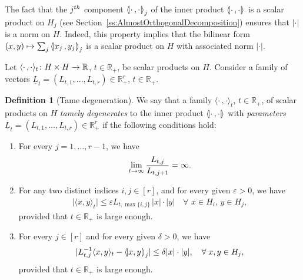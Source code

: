 \documentclass[10pt,a4paper]{amsart}
\newcommand{\innone}[2]{{\langle#2\rangle_{#1}}}
\newcommand{\llangle}{\mathopen{\langle\mkern -3.1mu\lvert}}
\newcommand{\rrangle}{\mathclose{\rvert\mkern -3.1mu\rangle}}
\newcommand{\highinn}[2]{{\llangle#2\rrangle_{#1}}}
\newcommand{\refnorm}[1]{\lvert#1\rvert}
\newcommand{\abs}[1]{\lvert #1\rvert}
\newcommand{\R}{\mathbb{R}}
\renewcommand*{\to}{\mathchoice{\longrightarrow}{\rightarrow}{\rightarrow}{\rightarrow}}
\let\oldmapsto\mapsto
\renewcommand*{\mapsto}{\mathchoice{\longmapsto}{\oldmapsto}{\oldmapsto}{\oldmapsto}}
\newcommand*{\relabel}{\renewcommand{\labelenumi}{(\theenumi)}}
\newcommand*{\alphenumi}{\renewcommand*{\theenumi}{\alph{enumi}}\relabel}
\let\oldforall\forall
\renewcommand*{\forall}{\mathrel{\oldforall}}
\theoremstyle{definition}\newtheorem{defi}[cdrthm]{Definition}
\begin{document}
The fact that the $j^{\rm th}$ component $\highinn{j}{\cdot \,, \cdot}$ of the inner product $\highinn{}{\cdot \,, \cdot}$ is a scalar product on $H_j$ (see Section~\ref{ss:AlmostOrthogonalDecomposition}) ensures that $\refnorm{\cdot}$ is a norm on $H$. Indeed, this property implies that the bilinear form $(x,y) \mapsto \sum_{j} \highinn{j}{x_j\,,y_j}$ is a scalar product on $H$ with associated norm $\refnorm{\cdot}$.

\setcounter{cdrthm}{2}
Let $\innone{t}{\cdot\,, \cdot} \colon H \times H \to \R$, $t\in \R_+$, be scalar products on $H$. Consider a family of vectors $\underline L_t = (L_{t,1}, \dots, L_{t,r}) \in \R_+^r$, $t\in \R_+$.

\begin{defi}[Tame degeneration] \label{def:TameDegenerations}
We say that a family $\innone{t}{\cdot\,, \cdot}$, $t\in \R_+$, of scalar products on $H$ \emph{tamely degenerates} to the inner product $\highinn{}{\cdot\,, \cdot}$ with \emph{parameters} $\underline L_t = (L_{t,1}, \dots, L_{t,r})\in \R_+^r$ if the following conditions hold:
\begin{enumerate}\alphenumi
\item \label{item:tame-a}
For every $j =1, \dots, r-1$, we have
\begin{equation}\label{eq:abstract_tame0}
\lim_{t \to \infty} \frac{L_{t,j}}{L_{t,j+1}} = \infty.
\end{equation}
\item \label{item:tame-b}


For any two distinct indices $i, j \in [r]$, and for every given $\varepsilon>0$, we have
\begin{align}\label{eq:abstract_tame1}
\abs{\innone{t}{x,y}} \le \varepsilon L_{t,\max\{i,j\}}\, \refnorm{x}\cdot\refnorm{y} \quad \forall\,\, x \in H_i, \, y \in H_j,
\end{align}
provided that $t\in \R_+$ is large enough.
\item \label{item:tame-c}
For every $j \in [r]$ and for every given $\delta >0$, we have
\begin{align}\label{eq:abstract_tame2}
\abs{L_{t,j}^{-1} \innone{t}{x, y} - \highinn{j}{x, y}} \le \delta \refnorm{x}\cdot\refnorm{y}, \quad \forall x,y \in H_j,
\end{align}
provided that $t\in \R_+$ is large enough. %
\end{enumerate}
\end{defi}
\end{document}
